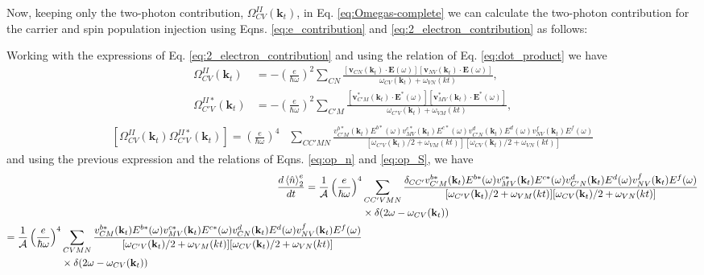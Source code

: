 \documentclass{article}
\newcommand{\kt}{\mathbf{k}_{t}}
\newcommand{\dw}{\delta(2\omega - \omega_{CV}(\kt))}
\begin{document}
Now, keeping only the two-photon contribution, $\Omega^{II}_{CV}(\kt)$, in Eq. 
\eqref{eq:Omegas-complete} we can calculate the two-photon contribution for the
carrier and spin population injection using Eqns. \eqref{eq:e_contribution} and
\eqref{eq:2_electron_contribution} as follows:

Working with the expressions of Eq.
\eqref{eq:2_electron_contribution} and using the relation of Eq.
\eqref{eq:dot_product} we have
\begin{align*}\label{eq:omegaICV_omegaI*CpV}
\Omega^{II}_{CV}(\kt) &= - \left(\frac{e}{\hbar\omega}\right)^{2}
\sum_{CN} \frac{[\mathbf{v}_{CN}(\kt) \cdot \mathbf{E}(\omega)]
[\mathbf{v}_{NV}(\kt)\cdot\mathbf{E}(\omega)]}{\omega_{CV}(\kt)+\omega_{VN}(kt)},\\
\Omega^{II*}_{C'V}(\kt) &= - \left(\frac{e}{\hbar\omega}\right)^{2}
\sum_{C'M} \frac{[\mathbf{v}^{*}_{C'M}(\kt) \cdot \mathbf{E}^{*}(\omega)]
[\mathbf{v}^{*}_{MV}(\kt)\cdot\mathbf{E}^{*}(\omega)]}{\omega_{C'V}(\kt)+\omega_{VM}(kt)}, \\
\end{align*}
\begin{equation}\label{eq:omegaII*CpV_omegaIICV_product}
\begin{split}
[\Omega^{II}_{CV}(\kt)\Omega^{II*}_{C'V}(\kt)] = \left(\frac{e}{\hbar\omega}\right)^{4} &
\sum_{CC'MN} \frac{v^{b*}_{C'M}(\kt) E^{b*}(\omega)v^{c*}_{MV}(\kt) E^{c*}(\omega)
v^{d}_{C'N}(\kt) E^{d}(\omega)v^{f}_{NV}(\kt) E^{f}(\omega)}
{[\omega_{C'V}(\kt)/2+\omega_{VM}(kt)][\omega_{CV}(\kt)/2+\omega_{VN}(kt)]}
\end{split}
\end{equation}
and using the previous expression and the relations of Eqns. \eqref{eq:op_n} and
\eqref{eq:op_S}, we have 
\begin{align}
\frac{d\ev*{\hat{n}}^{e}_2}{dt} = \frac{1}{\mathcal{A}} \left(\frac{e}{\hbar\omega}\right)^{4}&
\sum_{CC'VMN} \frac{\delta_{CC'} v^{b*}_{C'M}(\kt) E^{b*}(\omega)v^{c*}_{MV}(\kt) E^{c*}(\omega)
v^{d}_{C'N}(\kt) E^{d}(\omega)v^{f}_{NV}(\kt) E^{f}(\omega)}
{[\omega_{C'V}(\kt)/2+\omega_{VM}(kt)][\omega_{CV}(\kt)/2+\omega_{VN}(kt)]} \nonumber \\
& \times \dw \nonumber \\
\begin{split}
= \frac{1}{\mathcal{A}} \left(\frac{e}{\hbar\omega}\right)^{4} &
\sum_{CVMN} \frac{v^{b*}_{CM}(\kt) E^{b*}(\omega)v^{c*}_{MV}(\kt) E^{c*}(\omega)
v^{d}_{CN}(\kt) E^{d}(\omega)v^{f}_{NV}(\kt) E^{f}(\omega)}
{[\omega_{C'V}(\kt)/2+\omega_{VM}(kt)][\omega_{CV}(\kt)/2+\omega_{VN}(kt)]} \\
& \times \dw \label{eq:2w_n_final}
\end{split}
\end{align}
\end{document}
